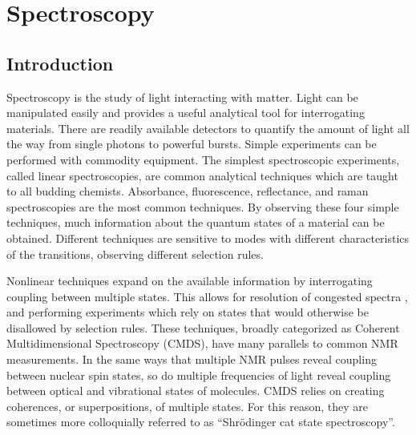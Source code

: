 \chapter{Spectroscopy} \label{cha:spec}

\clearpage

\section{Introduction}  %

Spectroscopy is the study of light interacting with matter.
Light can be manipulated easily and provides a useful analytical tool for interrogating materials.
There are readily available detectors to quantify the amount of light all the way from single photons to powerful bursts.
Simple experiments can be performed with commodity equipment.
The simplest spectroscopic experiments, called linear spectroscopies, are common analytical techniques which are taught to all budding chemists.
Absorbance, fluorescence, reflectance, and raman spectroscopies are the most common techniques.
By observing these four simple techniques, much information about the quantum states of a material can be obtained.
Different techniques are sensitive to modes with different characteristics of the transitions, observing different selection rules.

Nonlinear techniques expand on the available information by interrogating coupling between multiple states.
This allows for resolution of congested spectra \cite{Zhao_1999,DonaldsonPaulMurray2008a},  and performing experiments which rely on states that would otherwise be disallowed by selection rules\cite{BoyleErinSelene2013b,BoyleErinSelene2014a}.
These techniques, broadly categorized as Coherent Multidimensional Spectroscopy (CMDS), have many parallels to common NMR measurements\cite{KeustersDorine1999a,ZhaoWei2000b,PakoulevAndreiV2006a}.
In the same ways that multiple NMR pulses reveal coupling between nuclear spin states, so do multiple frequencies of light reveal coupling between optical and vibrational states of molecules.
CMDS relies on creating coherences, or superpositions, of multiple states.
For this reason, they are sometimes more colloquially referred to as ``Shr\"odinger cat state spectroscopy''\cite{Wright_2020}.

